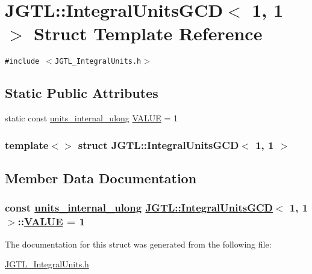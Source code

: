 \hypertarget{struct_j_g_t_l_1_1_integral_units_g_c_d_3_011_00_011_01_4}{
\section{JGTL::Integral\-Units\-GCD$<$ 1, 1 $>$ Struct Template Reference}
\label{struct_j_g_t_l_1_1_integral_units_g_c_d_3_011_00_011_01_4}
}
{\tt \#include $<$JGTL\_\-Integral\-Units.h$>$}

\subsection*{Static Public Attributes}
\begin{CompactItemize}
\item 
static const \hyperlink{namespace_j_g_t_l_1924d6fd42e2d9661bc0b5a5063b99b3}{units\_\-internal\_\-ulong} \hyperlink{struct_j_g_t_l_1_1_integral_units_g_c_d_3_011_00_011_01_4_5f4a82cfecdecfd02999df581518b0d8}{VALUE} = 1
\end{CompactItemize}
\subsubsection*{template$<$$>$ struct JGTL::Integral\-Units\-GCD$<$ 1, 1 $>$}



\subsection{Member Data Documentation}
\hypertarget{struct_j_g_t_l_1_1_integral_units_g_c_d_3_011_00_011_01_4_5f4a82cfecdecfd02999df581518b0d8}{
\subsubsection[VALUE]{\setlength{\rightskip}{0pt plus 5cm}const \hyperlink{namespace_j_g_t_l_1924d6fd42e2d9661bc0b5a5063b99b3}{units\_\-internal\_\-ulong} \hyperlink{struct_j_g_t_l_1_1_integral_units_g_c_d}{JGTL::Integral\-Units\-GCD}$<$ 1, 1 $>$::\hyperlink{struct_j_g_t_l_1_1_integral_units_g_c_d_3_011_00_011_01_4_5f4a82cfecdecfd02999df581518b0d8}{VALUE} = 1}}
\label{struct_j_g_t_l_1_1_integral_units_g_c_d_3_011_00_011_01_4_5f4a82cfecdecfd02999df581518b0d8}




The documentation for this struct was generated from the following file:\begin{CompactItemize}
\item 
\hyperlink{_j_g_t_l___integral_units_8h}{JGTL\_\-Integral\-Units.h}\end{CompactItemize}
